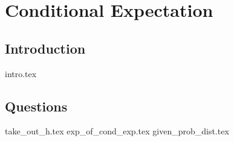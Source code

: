\documentclass{exam}
\begin{document}
\section{Conditional Expectation}
\subsection{Introduction}
{intro.tex}
\subsection{Questions}
\begin{questions}
{take_out_h.tex}
{exp_of_cond_exp.tex}
{given_prob_dist.tex}
\end{questions}
\end{document}
